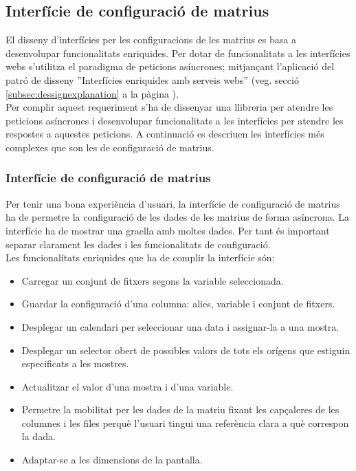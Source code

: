 \subsection{Interf\'{i}cie de configuraci\'{o} de matrius}
El disseny d'interfícies per les configuracions de les matrius es basa a desenvolupar funcionalitats enriquides.\cite{ria} Per dotar de funcionalitats a les interfícies webs s'utilitza el paradigma de peticions asíncrones;\cite{asyncronous} mitjançant l'aplicació del patró de disseny ''Interfícies enriquides amb serveis webs'' (veg. secció \ref{subsec:dessignexplanation} a la p\`{a}gina \pageref{ria}).\\ 

Per complir aquest requeriment s'ha de dissenyar una llibreria per atendre les peticions asíncrones i desenvolupar funcionalitats a les interfícies per atendre les respostes a aquestes peticions. A continuaci\'{o} es descriuen les interf\'{i}cies m\'{e}s complexes que son les de configuraci\'{o} de matrius.

\subsubsection{Interf\'{i}cie de configuraci\'{o} de matrius}
Per tenir una bona experiència d'usuari, la interfície de configuració de matrius ha de permetre la configuració de les dades de les matrius de forma asíncrona. La interfície ha de mostrar una graella amb moltes dades. Per tant \'{e}s important separar clarament les dades i les funcionalitats de configuració.\\

Les funcionalitats enriquides que ha de complir la interfície s\'{o}n:
\begin{itemize}
\item Carregar un conjunt de fitxers segons la variable seleccionada.
\item Guardar la configuració d'una columna: alies, variable i conjunt de fitxers.
\item Desplegar un calendari per seleccionar una data i assignar-la a una mostra.
\item Desplegar un selector obert de possibles valors de tots els orígens que estiguin especificats a les mostres.
\item Actualitzar el valor d'una mostra i d'una variable.
\item Permetre la mobilitat per les dades de la matriu fixant les capçaleres de les columnes i les files perquè l'usuari tingui una refer\`{e}ncia clara a qu\`{e} correspon la dada.
\item Adaptar-se a les dimensions de la pantalla.
\end{itemize}

